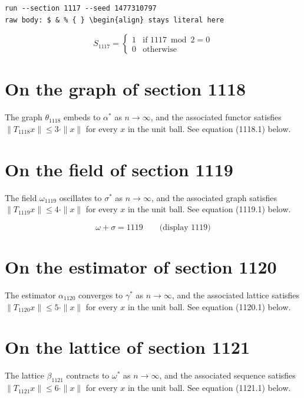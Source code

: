 \documentclass{article}
\begin{document}
\begin{verbatim}
run --section 1117 --seed 1477310797
raw body: $ & % { } \begin{align} stays literal here
\end{verbatim}

\begin{equation}
S_{1117} = \begin{cases} 1 & \text{if } 1117 \bmod 2 = 0 \\ 0 & \text{otherwise} \end{cases}
\end{equation}

\section{On the graph of section 1118}
The graph $\theta_{1118}$ embeds to $\alpha^{*}$ as $n \to \infty$,
and the associated functor satisfies $\|T_{1118} x\| \leq 3 \cdot \|x\|$
for every $x$ in the unit ball. See equation (1118.1) below.

\section{On the field of section 1119}
The field $\omega_{1119}$ oscillates to $\sigma^{*}$ as $n \to \infty$,
and the associated graph satisfies $\|T_{1119} x\| \leq 4 \cdot \|x\|$
for every $x$ in the unit ball. See equation (1119.1) below.

$$
\omega + \sigma = 1119 \qquad \text{(display 1119)}
$$

\section{On the estimator of section 1120}
The estimator $\alpha_{1120}$ converges to $\gamma^{*}$ as $n \to \infty$,
and the associated lattice satisfies $\|T_{1120} x\| \leq 5 \cdot \|x\|$
for every $x$ in the unit ball. See equation (1120.1) below.

\section{On the lattice of section 1121}
The lattice $\beta_{1121}$ contracts to $\omega^{*}$ as $n \to \infty$,
and the associated sequence satisfies $\|T_{1121} x\| \leq 6 \cdot \|x\|$
for every $x$ in the unit ball. See equation (1121.1) below.
\end{document}
